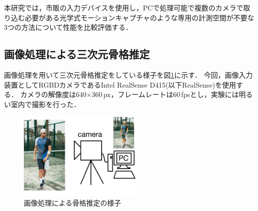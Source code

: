 \documentclass[titlepage]{jarticle}
\begin{document}
本研究では，市販の入力デバイスを使用し，PCで処理可能で複数のカメラで取り込む必要がある光学式モーションキャプチャのような専用の計測空間が不要な3つの方法について性能を比較評価する．
\subsection{画像処理による三次元骨格推定}\label{3Dskeleton}
画像処理を用いて三次元骨格推定をしている様子を図\ref{image_3D}に示す．
今回，画像入力装置としてRGBDカメラであるIntel RealSense D415(以下RealSense)を使用する．
カメラの解像度は640$\times$360\,px，フレームレートは60\,fpsとし，実験には明るい室内で撮影を行った．
\begin{figure}[b]
  \centering
  \includegraphics[width=6cm]{img/image_3D.jpg}
  \caption{画像処理による骨格推定の様子}
  \label{image_3D}
\end{figure}
\end{document}
